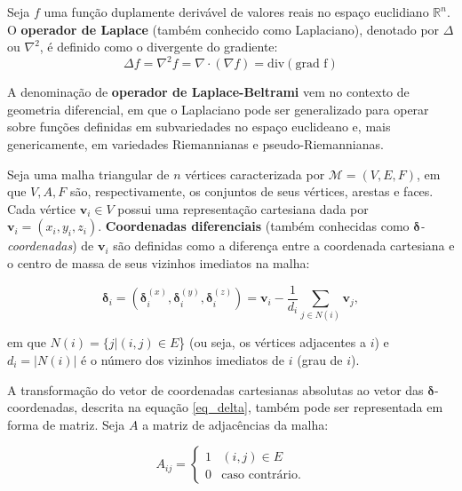 \begin{defi}
Seja $f$ uma função duplamente derivável de valores reais no espaço euclidiano $\mathbb{R}^n$. O \textbf{operador de Laplace} (também conhecido como Laplaciano), denotado por $\Delta$ ou $\nabla^2$, é definido como o divergente do gradiente:
\begin{equation}
\Delta f = \nabla^2 f = \nabla \cdot (\nabla f) = \text{div} (\text{grad f})
\end{equation}
\end{defi}

A denominação de \textbf{operador de Laplace-Beltrami} vem no contexto de geometria diferencial, em que o Laplaciano pode ser generalizado para operar sobre funções definidas em subvariedades no espaço euclideano e, mais genericamente, em variedades Riemannianas e pseudo-Riemannianas.

\begin{defi}
	Seja uma malha triangular de $n$ vértices caracterizada por $\mathcal{M} = (V, E, F)$, em que $V, A, F$ são, respectivamente, os conjuntos de seus vértices, arestas e faces. Cada vértice $\mathbf{v}_i \in V$ possui uma representação cartesiana dada por $\mathbf{v}_i = (x_i,y_i,z_i)$. \textbf{Coordenadas diferenciais} (também conhecidas como $\mathbf{\delta}$\textit{-coordenadas}) de $\mathbf{v}_i$ são definidas como a diferença entre a coordenada cartesiana e o centro de massa de seus vizinhos imediatos na malha:
	
	\begin{equation}
	\mathbf{\delta}_i = (\mathbf{\delta}_i^{(x)}, \mathbf{\delta}_i^{(y)}, \mathbf{\delta}_i^{(z)}) = \mathbf{v}_i - \frac{1}{d_i} \sum_{j \in N(i)} \mathbf{v}_j,
	\label{eq_delta}
	\end{equation}
	
	\noindent em que $N(i) = \{j|(i,j) \in E$\} (ou seja, os vértices adjacentes a $i$) e $d_i = |N(i)|$ é o número dos vizinhos imediatos de $i$ (grau de $i$).
\end{defi}

A transformação do vetor de coordenadas cartesianas absolutas ao vetor das $\mathbf{\delta}$-coordenadas, descrita na equação \ref{eq_delta}, também pode ser representada em forma de matriz. Seja $A$ a matriz de adjacências da malha:

\begin{equation}\label{eqMatAdj}
A_{ij} = \begin{cases}
1&(i, j) \in E\\
0&\text{caso contrário.}
\end{cases}
\end{equation}

